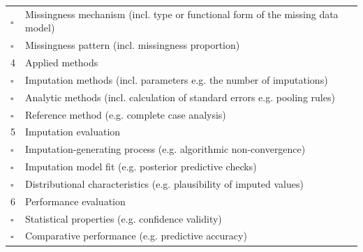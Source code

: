 \documentclass[bimj,fleqn]{w-art}
\begin{document}
\begin{table}[ht!]
\begin{tabular}{ll}
$\square$  & Missingness mechanism (incl. type or functional form of the missing data   model)  \\
$\square$  & Missingness pattern (incl. missingness proportion)                                 \\ \hline 
4 & Applied methods                                                                    \\ \cline{2-2}
$\square$  & Imputation methods (incl. parameters e.g. the number of imputations)               \\
$\square$  & Analytic methods (incl. calculation of standard errors e.g. pooling   rules)       \\
$\square$  & Reference method (e.g. complete case analysis)                                    \\ \hline 
5 & Imputation evaluation                                                              \\ \cline{2-2}
$\square$  & Imputation-generating process (e.g. algorithmic non-convergence)                   \\
$\square$  & Imputation model fit (e.g. posterior predictive checks)                            \\
$\square$  & Distributional characteristics (e.g. plausibility of imputed values)               \\ \hline 
6 & Performance evaluation                                                             \\ \cline{2-2}
$\square$  & Statistical properties (e.g. confidence validity)                                  \\
$\square$  & Comparative performance (e.g. predictive accuracy)                                 \\ \hline
\end{tabular}
\end{table}





\end{document}
